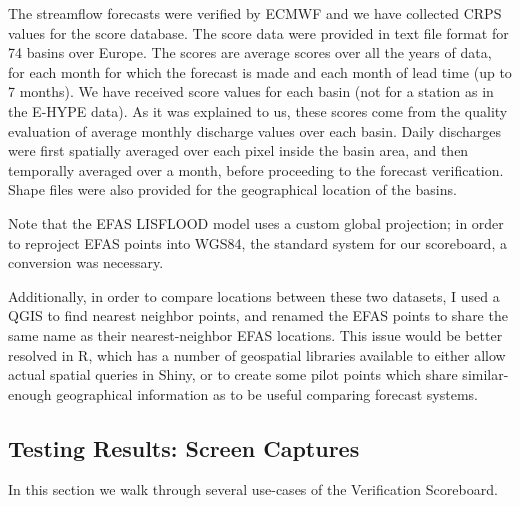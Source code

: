 \documentclass[logos,parttoc,morelanguage=french,morelanguage=german]{orsay-memoire}
\begin{document}
The streamflow forecasts were verified by ECMWF and we have collected CRPS values for the score database. The score data were provided in text file format for 74 basins over Europe. The scores are average scores over all the years of data, for each month for which the forecast is made and each month of lead time (up to 7 months). We have received score values for each basin (not for a station as in the E-HYPE data).  As it was explained to us, these scores come from the quality evaluation of average monthly discharge values over each basin. Daily discharges were first spatially averaged over each pixel inside the basin area, and then temporally averaged over a month, before proceeding to the forecast verification. Shape files were also provided for the geographical location of the basins.

Note that the EFAS LISFLOOD model uses a custom global projection; in order to reproject EFAS points into WGS84, the standard system for our scoreboard, a conversion was necessary.

Additionally, in order to compare locations between these two datasets, I used a QGIS to find nearest neighbor points, and renamed the EFAS points to share the same name as their nearest-neighbor EFAS locations. This issue would be better resolved in R, which has a number of geospatial libraries available to either allow actual spatial queries in Shiny, or to create some pilot points which share similar-enough geographical information as to be useful comparing forecast systems.


%
%

\subsection{Testing Results: Screen Captures}

In this section we walk through several use-cases of the Verification Scoreboard.
\end{document}
